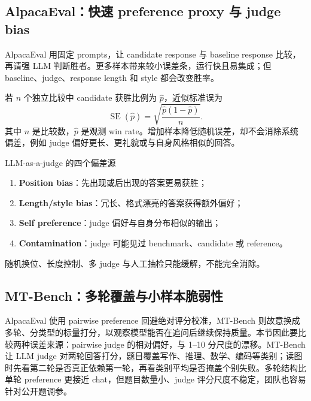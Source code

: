 \subsection{AlpacaEval：快速 preference proxy 与 judge bias}

AlpacaEval 用固定 prompts，让 candidate response 与 baseline response 比较，再请强 LLM 判断胜者。更多样本带来较小误差条，运行快且易集成；但 baseline、judge、response length 和 style 都会改变胜率。



若 $n$ 个独立比较中 candidate 获胜比例为 $\hat p$，近似标准误为
\[
\operatorname{SE}(\hat p)=\sqrt{\frac{\hat p(1-\hat p)}{n}}.
\]
其中 $n$ 是比较数，$\hat p$ 是观测 win rate。增加样本降低随机误差，却不会消除系统偏差，例如 judge 偏好更长、更礼貌或与自身风格相似的回答。


\begin{warningbox}{LLM-as-a-judge 的四个偏差源}
\begin{enumerate}
  \item \textbf{Position bias}：先出现或后出现的答案更易获胜；
  \item \textbf{Length/style bias}：冗长、格式漂亮的答案获得额外偏好；
  \item \textbf{Self preference}：judge 偏好与自身分布相似的输出；
  \item \textbf{Contamination}：judge 可能见过 benchmark、candidate 或 reference。
\end{enumerate}
随机换位、长度控制、多 judge 与人工抽检只能缓解，不能完全消除。
\end{warningbox}


\subsection{MT-Bench：多轮覆盖与小样本脆弱性}

AlpacaEval 使用 pairwise preference 回避绝对评分校准，MT-Bench 则故意换成多轮、分类型的标量打分，以观察模型能否在追问后继续保持质量。本节因此要比较两种误差来源：pairwise judge 的相对偏好，与 1--10 分尺度的漂移。MT-Bench 让 LLM judge 对两轮回答打分，题目覆盖写作、推理、数学、编码等类别；读图时先看第二轮是否真正依赖第一轮，再看类别平均是否掩盖个别失败。多轮结构比单轮 preference 更接近 chat，但题目数量小、judge 评分尺度不稳定，团队也容易针对公开题调参。

